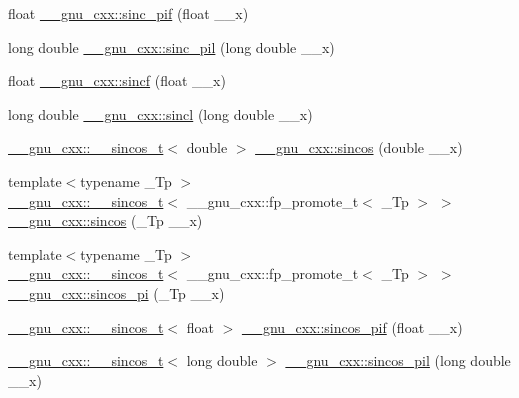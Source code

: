 \begin{DoxyCompactItemize}
float \hyperlink{group__gnu__math__spec__func_gad92d43d5332c80d1a27c90bfe3f6417e}{\+\_\+\+\_\+gnu\+\_\+cxx\+::sinc\+\_\+pif} (float \+\_\+\+\_\+x)
\item 
long double \hyperlink{group__gnu__math__spec__func_gaad38a6e40b1272391a26dbb32a684b3c}{\+\_\+\+\_\+gnu\+\_\+cxx\+::sinc\+\_\+pil} (long double \+\_\+\+\_\+x)
\item 
float \hyperlink{group__gnu__math__spec__func_gaa87f0734cfe7823c932511ac2f0a876c}{\+\_\+\+\_\+gnu\+\_\+cxx\+::sincf} (float \+\_\+\+\_\+x)
\item 
long double \hyperlink{group__gnu__math__spec__func_ga79a8fd931f5ad4f737e2931e636149ac}{\+\_\+\+\_\+gnu\+\_\+cxx\+::sincl} (long double \+\_\+\+\_\+x)
\item 
\hyperlink{struct____gnu__cxx_1_1____sincos__t}{\+\_\+\+\_\+gnu\+\_\+cxx\+::\+\_\+\+\_\+sincos\+\_\+t}$<$ double $>$ \hyperlink{group__gnu__math__spec__func_ga8041c24b528475bcf8a4178e484652a3}{\+\_\+\+\_\+gnu\+\_\+cxx\+::sincos} (double \+\_\+\+\_\+x)
\item 
{\footnotesize template$<$typename \+\_\+\+Tp $>$ }\\\hyperlink{struct____gnu__cxx_1_1____sincos__t}{\+\_\+\+\_\+gnu\+\_\+cxx\+::\+\_\+\+\_\+sincos\+\_\+t}$<$ \+\_\+\+\_\+gnu\+\_\+cxx\+::fp\+\_\+promote\+\_\+t$<$ \+\_\+\+Tp $>$ $>$ \hyperlink{group__gnu__math__spec__func_ga5d3a375ada451e0a9a78441ddfcf52a3}{\+\_\+\+\_\+gnu\+\_\+cxx\+::sincos} (\+\_\+\+Tp \+\_\+\+\_\+x)
\item 
{\footnotesize template$<$typename \+\_\+\+Tp $>$ }\\\hyperlink{struct____gnu__cxx_1_1____sincos__t}{\+\_\+\+\_\+gnu\+\_\+cxx\+::\+\_\+\+\_\+sincos\+\_\+t}$<$ \+\_\+\+\_\+gnu\+\_\+cxx\+::fp\+\_\+promote\+\_\+t$<$ \+\_\+\+Tp $>$ $>$ \hyperlink{group__gnu__math__spec__func_ga6553883f127ea0de67041c3128e03813}{\+\_\+\+\_\+gnu\+\_\+cxx\+::sincos\+\_\+pi} (\+\_\+\+Tp \+\_\+\+\_\+x)
\item 
\hyperlink{struct____gnu__cxx_1_1____sincos__t}{\+\_\+\+\_\+gnu\+\_\+cxx\+::\+\_\+\+\_\+sincos\+\_\+t}$<$ float $>$ \hyperlink{group__gnu__math__spec__func_gacf416c867a8a456f8f0e3d8b45ca8bd5}{\+\_\+\+\_\+gnu\+\_\+cxx\+::sincos\+\_\+pif} (float \+\_\+\+\_\+x)
\item 
\hyperlink{struct____gnu__cxx_1_1____sincos__t}{\+\_\+\+\_\+gnu\+\_\+cxx\+::\+\_\+\+\_\+sincos\+\_\+t}$<$ long double $>$ \hyperlink{group__gnu__math__spec__func_ga1f1efc07313a3de1e994d89c3b83b957}{\+\_\+\+\_\+gnu\+\_\+cxx\+::sincos\+\_\+pil} (long double \+\_\+\+\_\+x)
\item 

\end{DoxyCompactItemize}
